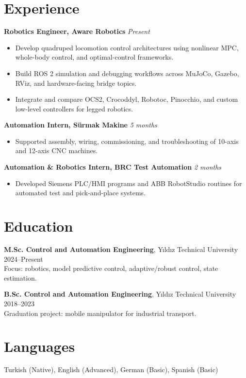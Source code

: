 \documentclass[10pt,a4paper]{article}
\begin{document}
\section*{Experience}
\textbf{Robotics Engineer, Aware Robotics} \hfill \textit{Present}
\begin{itemize}
\item Develop quadruped locomotion control architectures using nonlinear MPC, whole-body control, and optimal-control frameworks.
\item Build ROS 2 simulation and debugging workflows across MuJoCo, Gazebo, RViz, and hardware-facing bridge topics.
\item Integrate and compare OCS2, Crocoddyl, Robotoc, Pinocchio, and custom low-level controllers for legged robotics.
\end{itemize}

\textbf{Automation Intern, Sürmak Makine} \hfill \textit{5 months}
\begin{itemize}
\item Supported assembly, wiring, commissioning, and troubleshooting of 10-axis and 12-axis CNC machines.
\end{itemize}

\textbf{Automation \& Robotics Intern, BRC Test Automation} \hfill \textit{2 months}
\begin{itemize}
\item Developed Siemens PLC/HMI programs and ABB RobotStudio routines for automated test and pick-and-place systems.
\end{itemize}

\section*{Education}
\textbf{M.Sc. Control and Automation Engineering}, Yıldız Technical University \hfill 2024--Present\\
Focus: robotics, model predictive control, adaptive/robust control, state estimation.

\textbf{B.Sc. Control and Automation Engineering}, Yıldız Technical University \hfill 2018--2023\\
Graduation project: mobile manipulator for industrial transport.

\section*{Languages}
Turkish (Native), English (Advanced), German (Basic), Spanish (Basic)
\end{document}
